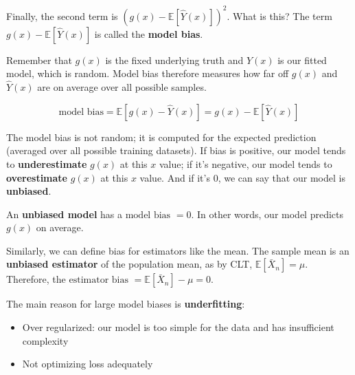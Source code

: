 \documentclass[
  letterpaper,
  DIV=11,
  numbers=noendperiod]{scrreprt}
\providecommand{\tightlist}{%
  \setlength{\itemsep}{0pt}\setlength{\parskip}{0pt}}\usepackage{longtable,booktabs,array}
\begin{document}
Finally, the second term is
\(\left(g(x)-\mathbb{E}\left[\hat{Y}(x)\right]\right)^2\). What is this?
The term \(g(x) - \mathbb{E}\left[\hat{Y}(x)\right]\) is called the
\textbf{model bias}.

Remember that \(g(x)\) is the fixed underlying truth and \(\hat{Y}(x)\)
is our fitted model, which is random. Model bias therefore measures how
far off \(g(x)\) and \(\hat{Y}(x)\) are on average over all possible
samples.

\[\text{model bias} = \mathbb{E}\left[g(x) - \hat{Y}(x)\right] = g(x) - \mathbb{E}\left[\hat{Y}(x)\right]\]

The model bias is not random; it is computed for the expected prediction
(averaged over all possible training datasets). If bias is positive, our
model tends to \textbf{underestimate} \(g(x)\) at this \(x\) value; if
it's negative, our model tends to \textbf{overestimate} \(g(x)\) at this
\(x\) value. And if it's 0, we can say that our model is
\textbf{unbiased}.

\begin{tcolorbox}[enhanced jigsaw, colback=white, arc=.35mm, toprule=.15mm, colframe=quarto-callout-tip-color-frame, coltitle=black, opacitybacktitle=0.6, breakable, titlerule=0mm, leftrule=.75mm, left=2mm, opacityback=0, bottomtitle=1mm, rightrule=.15mm, colbacktitle=quarto-callout-tip-color!10!white, bottomrule=.15mm, title=\textcolor{quarto-callout-tip-color}{\faLightbulb}\hspace{0.5em}{Unbiased Estimators}, toptitle=1mm]

An \textbf{unbiased model} has a \(\text{model bias } = 0\). In other
words, our model predicts \(g(x)\) on average.

Similarly, we can define bias for estimators like the mean. The sample
mean is an \textbf{unbiased estimator} of the population mean, as by
CLT, \(\mathbb{E}[\bar{X}_n] = \mu\). Therefore, the
\(\text{estimator bias } = \mathbb{E}[\bar{X}_n] - \mu = 0\).

\end{tcolorbox}

The main reason for large model biases is \textbf{underfitting}:

\begin{itemize}
\tightlist
\item
  Over regularized: our model is too simple for the data and has
  insufficient complexity
\item
  Not optimizing loss adequately
\end{itemize}
\end{document}
